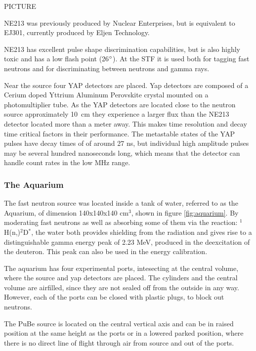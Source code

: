 \documentclass[main.tex]{subfiles}
\begin{document}
PICTURE

NE213 was previously produced by Nuclear Enterprises, but is equivalent to EJ301, currently produced by Eljen Technology. 

NE213 has excellent pulse shape discrimination capabilities, but is also highly toxic and has a low flash point (26$\text{\degree}$). At the STF it is used both for tagging fast neutrons and for discriminating between neutrons and gamma rays. 

Near the source four YAP detectors are placed. Yap detectors are composed of a Cerium doped Yttrium Aluminum Perovskite crystal mounted on a photomultiplier tube. As the YAP detectors are located close to the neutron source approximately \si{10\cm} they experience a larger flux than the NE213 detector located more than a meter away. This makes time resolution and decay time critical factors in their performance. The metastable states of the YAP pulses have decay times of of around 27 ns, but individual high amplitude pulses may be several hundred nanoseconds long, which means that the detector can handle count rates in the low MHz range.

\subsubsection{The Aquarium}
The fast neutron source was located inside a tank of water, referred to as the Aquarium, of dimension 140x140x140 \si{\cm}${}^\text{3}$, shown in figure \ref{fig:aquarium}. By moderating fast neutrons as well as absorbing some of them via the reaction: $^{\text{1}}$H(n,\textgamma)$^{\text{2}}$D$^*$, the water both provides shielding from the radiation and gives rise to a distinguishable gamma energy peak of 2.23 MeV, produced in the deexcitation of the deuteron. This peak can also be used in the energy calibration.

The aquarium has four experimental ports, intesecting at the central volume, where the source and yap detectors are placed. The cylinders and the central volume are airfilled, since they are not sealed off from the outside in any way. However, each of the ports can be closed with plastic plugs, to block out neutrons.

The PuBe source is located on the central vertical axis and can be in raised position at the same height as the ports or in a lowered parked position, where there is no direct line of flight through air from source and out of the ports.
\end{document}

